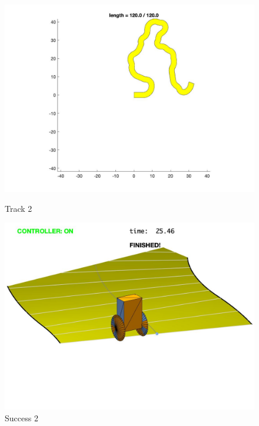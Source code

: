 \documentclass{article}
\begin{document}
\begin{figure}[H]
\centering
\begin{minipage}{.5\textwidth}
	\centering
	\includegraphics[width=.8\linewidth]{track 2.jpg}
	\caption{Track 2}
	\end{minipage}%
\begin{minipage}{.5\textwidth}
	\centering
	\includegraphics[width=.8\linewidth]{track 2r.jpg}
	\caption{Success 2}
\end{minipage}
\end{figure}
\end{document}
